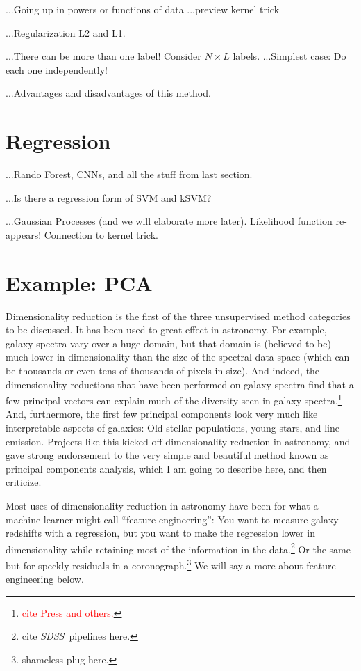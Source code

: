 \documentclass[12pt, twoside, letterpaper]{article}
\newcommand{\acronym}[1]{{\small{#1}}}
\newcommand{\project}[1]{\textsl{#1}}
\newcommand{\SDSS}{\project{\acronym{SDSS}}}
\newcommand{\todo}[1]{\textcolor{red}{#1}}  %
\begin{document}
...Going up in powers or functions of data
...preview kernel trick

...Regularization L2 and L1.

...There can be more than one label! Consider $N\times L$ labels.
...Simplest case: Do each one independently!

...Advantages and disadvantages of this method.

\section{Regression}

...Rando Forest, CNNs, and all the stuff from last section.

...Is there a regression form of SVM and kSVM?

...Gaussian Processes (and we will elaborate more later).
Likelihood function re-appears!
Connection to kernel trick.

\section{Example: PCA}

Dimensionality reduction is the first of the three unsupervised
method categories to be discussed.
It has been used to great effect in astronomy.
For example, galaxy spectra vary over a huge domain, but that
domain is (believed to be) much lower in dimensionality than the size
of the spectral data space (which can be thousands or even tens of
thousands of pixels in size).
And indeed, the dimensionality reductions that have been performed on
galaxy spectra find that a few principal vectors can explain much of
the diversity seen in galaxy spectra.\footnote{\todo{cite Press and
    others.}}
And, furthermore, the first few principal components look very much
like interpretable aspects of galaxies: Old stellar populations, young
stars, and line emission.
Projects like this kicked off dimensionality reduction in astronomy,
and gave strong endorsement to the very simple and beautiful method
known as principal components analysis, which I am going to describe
here, and then criticize.

Most uses of dimensionality reduction in astronomy have been for 
what a machine learner might call ``feature engineering'': You want
to measure galaxy redshifts with a regression, but you want to make the regression
lower in dimensionality while retaining most of the information
in the data.\footnote{cite \SDSS\ pipelines here.}
Or the same but for speckly residuals in a coronograph.\footnote{shameless plug here.}
We will say a more about feature engineering below.
\end{document}
